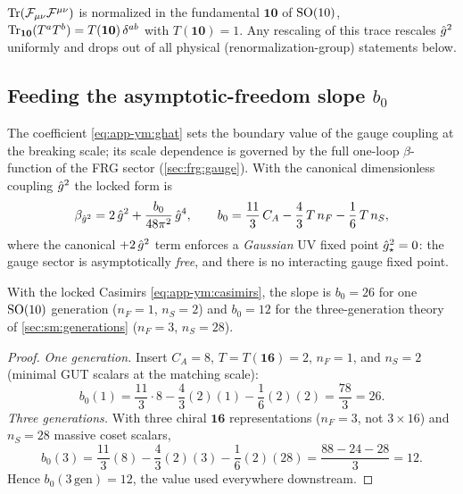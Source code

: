 \begin{remark}\label{rem:app-ym:norm}
$\operatorname{Tr}(\mathcal F_{\mu\nu}\mathcal F^{\mu\nu})$ is normalized in the
fundamental $\mathbf{10}$ of $\mathrm{SO}(10)$, $\operatorname{Tr}_{\mathbf{10}}(T^{a}T^{b})
=T(\mathbf{10})\,\delta^{ab}$ with $T(\mathbf{10})=1$. Any rescaling of
this trace rescales $\hat g^{2}$ uniformly and drops out of all
physical (renormalization-group) statements below.
\end{remark}

\subsection{Feeding the asymptotic-freedom slope $b_{0}$}
\label{sec:app-ym:b0}

The coefficient \eqref{eq:app-ym:ghat} sets the boundary value of the
gauge coupling at the breaking scale; its scale dependence is governed
by the full one-loop $\beta$-function of the FRG sector
(\autoref{sec:frg:gauge}). With the canonical dimensionless coupling
$\hat g^{2}$ the locked form is
\begin{equation}\label{eq:app-ym:beta}
  \beta_{\hat g^{2}}
  =2\,\hat g^{2}+\frac{b_{0}}{48\pi^{2}}\,\hat g^{4},
  \qquad
  b_{0}=\frac{11}{3}\,C_{A}-\frac{4}{3}\,T\,n_{F}
        -\frac16\,T\,n_{S} ,
\end{equation}
where the canonical $+2\,\hat g^{2}$ term enforces a \emph{Gaussian} UV
fixed point $\hat g^{2}_{\star}=0$: the gauge sector is asymptotically
\emph{free}, and there is no interacting gauge fixed point.

\begin{theorem}
\label{thm:app-ym:b0}
With the locked Casimirs \eqref{eq:app-ym:casimirs}, the slope is
$b_{0}=26$ for one $\mathrm{SO}(10)$ generation ($n_{F}=1$, $n_{S}=2$) and
$b_{0}=12$ for the three-generation theory of \autoref{sec:sm:generations}
($n_{F}=3$, $n_{S}=28$).
\end{theorem}

\begin{proof}
\emph{One generation.} Insert $C_{A}=8$, $T=T(\mathbf{16})=2$, $n_{F}=1$,
and $n_{S}=2$ (minimal GUT scalars at the matching scale):
\begin{equation}\label{eq:app-ym:b0one}
  b_{0}(1)
  =\frac{11}{3}\cdot 8-\frac43(2)(1)-\frac16(2)(2)
  =\frac{78}{3}=26 .
\end{equation}
\emph{Three generations.} With three chiral $\mathbf{16}$ representations
($n_{F}=3$, not $3\times16$) and $n_{S}=28$ massive coset scalars,
\begin{equation}\label{eq:app-ym:b0lin}
  b_{0}(3)
  =\frac{11}{3}(8)-\frac43(2)(3)-\frac16(2)(28)
  =\frac{88-24-28}{3}=12 .
\end{equation}
Hence $b_{0}(3\,\mathrm{gen})=12$, the value used everywhere downstream.
\end{proof}

